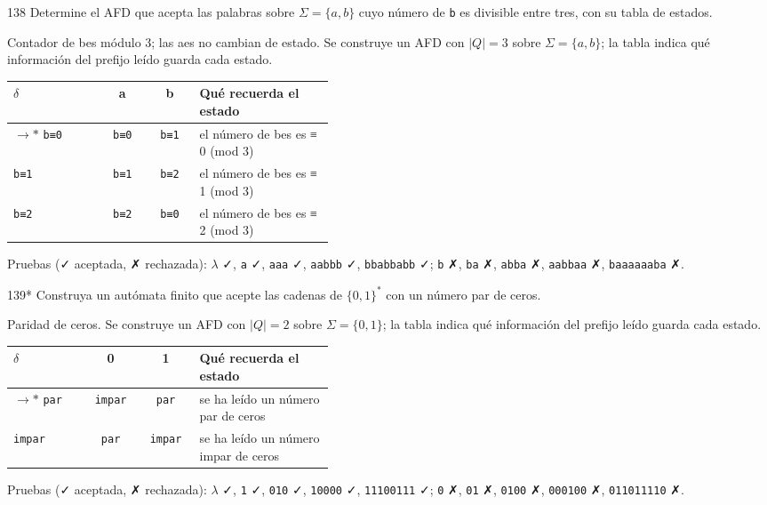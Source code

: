\documentclass[11pt]{article}
\begin{document}
\begin{ejercicio}{138}{}
Determine el AFD que acepta las palabras sobre $\Sigma = \{a, b\}$ cuyo número de \texttt{b} es divisible entre tres, con su tabla de estados.
\end{ejercicio}
\proc Contador de bes módulo 3; las aes no cambian de estado. Se construye un AFD con $|Q| = 3$ sobre $\Sigma = \{a, b\}$; la tabla indica qué información del prefijo leído guarda cada estado.
\begin{center}\small\begin{tabular}{lccp{0.42\linewidth}}\toprule
$\delta$ & a & b & Qué recuerda el estado \\\midrule
$\to$$*$ \texttt{b≡0} & \texttt{b≡0} & \texttt{b≡1} & el número de bes es ≡ 0 (mod 3) \\
 \texttt{b≡1} & \texttt{b≡1} & \texttt{b≡2} & el número de bes es ≡ 1 (mod 3) \\
 \texttt{b≡2} & \texttt{b≡2} & \texttt{b≡0} & el número de bes es ≡ 2 (mod 3) \\
\bottomrule\end{tabular}\end{center}
Pruebas (✓ aceptada, ✗ rechazada): $\lambda$ ✓, \texttt{a} ✓, \texttt{aaa} ✓, \texttt{aabbb} ✓, \texttt{bbabbabb} ✓; \texttt{b} ✗, \texttt{ba} ✗, \texttt{abba} ✗, \texttt{aabbaa} ✗, \texttt{baaaaaaba} ✗.



\begin{ejercicio}{139}{*}
Construya un autómata finito que acepte las cadenas de $\{0, 1\}^*$ con un número par de ceros.
\end{ejercicio}
\proc Paridad de ceros. Se construye un AFD con $|Q| = 2$ sobre $\Sigma = \{0, 1\}$; la tabla indica qué información del prefijo leído guarda cada estado.
\begin{center}\small\begin{tabular}{lccp{0.42\linewidth}}\toprule
$\delta$ & 0 & 1 & Qué recuerda el estado \\\midrule
$\to$$*$ \texttt{par} & \texttt{impar} & \texttt{par} & se ha leído un número par de ceros \\
 \texttt{impar} & \texttt{par} & \texttt{impar} & se ha leído un número impar de ceros \\
\bottomrule\end{tabular}\end{center}
Pruebas (✓ aceptada, ✗ rechazada): $\lambda$ ✓, \texttt{1} ✓, \texttt{010} ✓, \texttt{10000} ✓, \texttt{11100111} ✓; \texttt{0} ✗, \texttt{01} ✗, \texttt{0100} ✗, \texttt{000100} ✗, \texttt{011011110} ✗.
\end{document}
